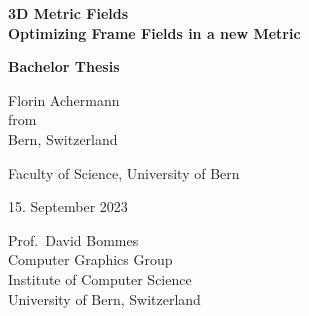 \documentclass[a4paper,twoside,openright,11pt]{report}
\newcommand{\thesistitle}{3D Metric Fields}
\newcommand{\thesisauthor}{Florin Achermann}
\newcommand{\thesisauthororigin}{Bern, Switzerland}
\newcommand{\thesisleiter}{Prof.\ David Bommes}
\newcommand{\thesissubtitle}{Optimizing Frame Fields in a new Metric}
\newcommand{\thesisdate}{15. September 2023}
\begin{document}

\begin{titlepage}  
  \thispagestyle{empty}

  \begin{center}  
    \begin{figure}[t]  
      \vspace{1in}     
    \end{figure}
    
    {\bfseries\Huge \thesistitle \\[2mm]
      \Large \thesissubtitle}\\
    \vspace{1.5cm}

    {\bfseries\LARGE Bachelor Thesis}\\
    \vspace{1.5cm}
    
    {\Large \thesisauthor\\[2mm]
      from\\[2mm]
      \thesisauthororigin}\\
    \vspace{1.5cm}

    {\Large Faculty of Science, University of Bern}\\
    \vspace{1.5cm}

    {\Large \thesisdate}\\
    \vspace{1.5cm}

    \vspace*{\fill}
    {\Large
      \thesisleiter\\
      Computer Graphics Group\\
      Institute of Computer Science\\
      University of Bern, Switzerland\\}
  \end{center}
\end{titlepage}
\end{document}
